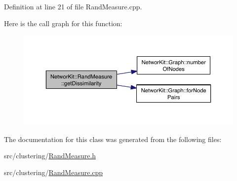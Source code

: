 Definition at line 21 of file Rand\-Measure.\-cpp.



Here is the call graph for this function\-:\nopagebreak
\begin{figure}[H]
\begin{center}
\leavevmode
\includegraphics[width=350pt]{class_networ_kit_1_1_rand_measure_a017a320b3c9a06f3c1076adfb8944674_cgraph}
\end{center}
\end{figure}




The documentation for this class was generated from the following files\-:\begin{DoxyCompactItemize}
\item 
src/clustering/\hyperlink{_rand_measure_8h}{Rand\-Measure.\-h}\item 
src/clustering/\hyperlink{_rand_measure_8cpp}{Rand\-Measure.\-cpp}\end{DoxyCompactItemize}
